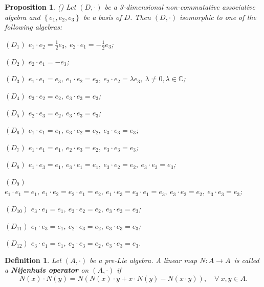 \documentclass[12pt, reqno]{amsart}
\theoremstyle{plain}
\newtheorem{proposition}[theorem]{Proposition}
\newtheorem{definition}[theorem]{Definition}
\begin{document}
\begin{proposition}\label{non-commutative 3 dim pre-Lie algebra}\rm{(\cite{Bai-1})}
Let $\left(D, \cdot\right)$ be a 3-dimensional non-commutative associative algebra and $\left\{e_{1}, e_{2}, e_{3}\right\}$ be a basis of $D$. Then $(D,\cdot)$ isomorphic to  one of the
following algebras:

$(D_1)$ $e_1 \cdot e_2 = \frac{1}{2} e_3,~
e_2 \cdot e_1 = -\frac{1}{2} e_3$;

$(D_2)$ $e_2 \cdot e_1 = - e_3$;

$(D_3)$ $e_1 \cdot
e_1 =  e_3,~e_1 \cdot e_2 = e_3,~ e_2 \cdot e_2 =\lambda e_3,~\lambda \neq 0, \lambda\in \mathbb{C}$;

$(D_4)$ $e_3 \cdot e_2 = e_2,~e_3 \cdot e_3 =e_3$;

$(D_5)$ $e_2 \cdot e_3 =e_2,~e_3
\cdot e_3 =e_3$;

$(D_6)$ $e_1
\cdot e_1 =e_1,~e_3 \cdot e_2 =e_2,~e_3 \cdot e_3 =e_3$;

$(D_7)$ $e_1 \cdot e_1 =e_1,~e_2 \cdot e_3
=e_2,~e_3 \cdot e_3 =e_3$;

$(D_8)$ $e_1
\cdot e_3 =e_1,~e_3 \cdot e_1 =e_1,~e_3 \cdot e_2 =e_2,~e_3
\cdot e_3 =e_3$;

$(D_9)$ $e_1 \cdot e_1 =e_1,~e_1
\cdot e_2 =e_2 \cdot e_1 =e_2,~e_1 \cdot e_3 =e_3 \cdot e_1=e_3,~
e_3 \cdot e_2 =e_2,~e_3 \cdot
e_3 =e_3$;

$(D_{10})$ $e_3 \cdot e_1 =e_1,~e_3 \cdot e_2
=e_2,~e_3 \cdot e_3 =e_3$;

$(D_{11})$ $e_1 \cdot e_3 =e_1,~e_2 \cdot e_3
=e_2,~e_3 \cdot e_3 =e_3$;

$(D_{12})$ $e_3 \cdot e_1 =e_1,~e_2 \cdot e_3
=e_2,~e_3 \cdot e_3 =e_3$.
\end{proposition}

\begin{definition} \rm{\cite{Wang}}
Let $(A, \cdot)$ be a pre-Lie algebra. A linear map  $N: A \rightarrow A$~is called a {\bf Nijenhuis operator} on $(A, \cdot)$ if
\begin{equation}\label{eq:Ni ope1}
N(x) \cdot N(y)=N(N(x) \cdot  y+x \cdot N(y)-N(x \cdot  y)),\quad\forall~ x, y \in A.
\end{equation}
\end{definition}
\end{document}
